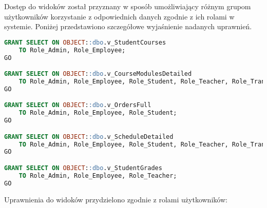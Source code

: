 \documentclass[12pt]{article}
\begin{document}
\noindent Dostęp do widoków został przyznany w sposób umożliwiający różnym grupom użytkowników korzystanie z odpowiednich danych zgodnie z ich rolami w systemie.  
Poniżej przedstawiono szczegółowe wyjaśnienie nadanych uprawnień.

\begin{lstlisting}[language=SQL]
GRANT SELECT ON OBJECT::dbo.v_StudentCourses 
    TO Role_Admin, Role_Employee;
GO

GRANT SELECT ON OBJECT::dbo.v_CourseModulesDetailed
    TO Role_Admin, Role_Employee, Role_Student, Role_Teacher, Role_Translator;
GO

GRANT SELECT ON OBJECT::dbo.v_OrdersFull
    TO Role_Admin, Role_Employee, Role_Student;
GO

GRANT SELECT ON OBJECT::dbo.v_ScheduleDetailed
    TO Role_Admin, Role_Employee, Role_Student, Role_Teacher, Role_Translator;
GO

GRANT SELECT ON OBJECT::dbo.v_StudentGrades
    TO Role_Admin, Role_Employee, Role_Teacher;
GO
\end{lstlisting}


\noindent Uprawnienia do widoków przydzielono zgodnie z rolami użytkowników:
\end{document}

